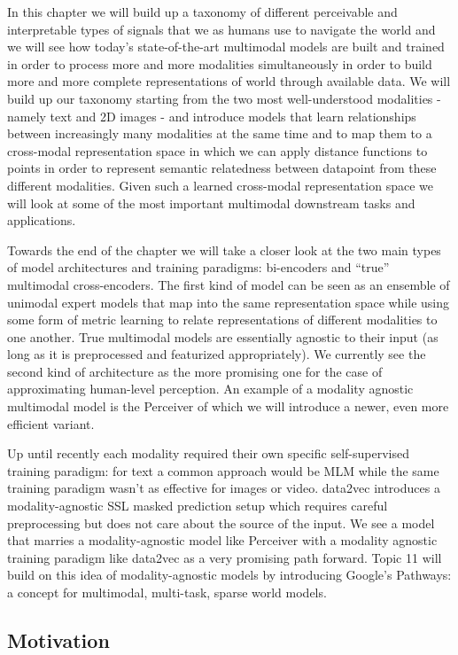 \documentclass[
]{krantz}
\begin{document}
In this chapter we will build up a taxonomy of different perceivable and interpretable types of signals that we as humans use to navigate the world and we will see how today's state-of-the-art multimodal models are built and trained in order to process more and more modalities simultaneously in order to build more and more complete representations of world through available data. We will build up our taxonomy starting from the two most well-understood modalities - namely text and 2D images - and introduce models that learn relationships between increasingly many modalities at the same time and to map them to a cross-modal representation space in which we can apply distance functions to points in order to represent semantic relatedness between datapoint from these different modalities.
Given such a learned cross-modal representation space we will look at some of the most important multimodal downstream tasks and applications.

Towards the end of the chapter we will take a closer look at the two main types of model architectures and training paradigms: bi-encoders and ``true'' multimodal cross-encoders. The first kind of model can be seen as an ensemble of unimodal expert models that map into the same representation space while using some form of metric learning to relate representations of different modalities to one another. True multimodal models are essentially agnostic to their input (as long as it is preprocessed and featurized appropriately). We currently see the second kind of architecture as the more promising one for the case of approximating human-level perception. An example of a modality agnostic multimodal model is the Perceiver of which we will introduce a newer, even more efficient variant.

Up until recently each modality required their own specific self-supervised training paradigm: for text a common approach would be MLM while the same training paradigm wasn't as effective for images or video. data2vec introduces a modality-agnostic SSL masked prediction setup which requires careful preprocessing but does not care about the source of the input. We see a model that marries a modality-agnostic model like Perceiver with a modality agnostic training paradigm like data2vec as a very promising path forward.
Topic 11 will build on this idea of modality-agnostic models by introducing Google's Pathways: a concept for multimodal, multi-task, sparse world models.

\hypertarget{motivation}{%
\subsection{Motivation}\label{motivation}}
\end{document}
